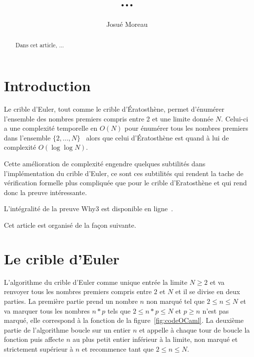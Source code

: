 \documentclass[a4paper]{easychair}
\begin{document}
\title{...}
\author{Josué Moreau}
\maketitle

\begin{abstract}
  Dans cet article, ...
\end{abstract}

\section{Introduction}


Le crible d'Euler, tout comme le crible d'\'{E}ratosthène, permet d'énumérer
l'ensemble des nombres premiers compris entre 2 et une limite donnée $N$.
Celui-ci a une complexité temporelle en $O(N)$ pour énumérer tous les
nombres premiers dans l'ensemble $\{2,...,N\}$~\cite{crible-euler} alors que celui
d'\'{E}ratosthène est quand à lui de complexité $O(\log\log N)$.

Cette amélioration de complexité engendre quelques subtilités dans l'implémentation
du crible d'Euler, ce sont ces subtilités qui rendent la tache de vérification
formelle plus compliquée que pour le crible d'{E}ratosthène et qui rend donc la
preuve intéressante.




L'intégralité de la preuve Why3 est disponible en ligne~\cite{mapreuve}.

Cet article est organisé de la façon suivante.

\section{Le crible d'Euler}


L'algorithme du crible d'Euler comme unique entrée la limite $N \geq 2$ et va
renvoyer tous les nombres premiers compris entre $2$ et $N$ et il se divise en
deux parties. La première partie prend un nombre $n$ non marqué
tel que $2 \leq n \leq N$ et va marquer tous les nombres $n * p$ tels que
$2 \leq n * p \leq N$ et $p \geq n$ n'est pas marqué, elle correspond à la fonction
 de la figure~\ref{fig:codeOCaml}.
La deuxième partie de l'algorithme boucle sur un entier $n$ et appelle à chaque
tour de boucle la fonction  puis affecte $n$ au plus
petit entier inférieur à la limite, non marqué et strictement supérieur à $n$
et recommence tant que $2 \leq n \leq N$.
\end{document}
